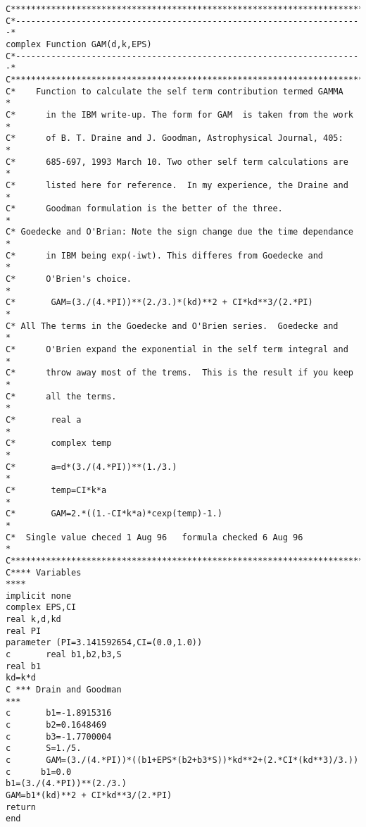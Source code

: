 \documentclass{article}
\begin{document}
\begin{verbatim}
C***********************************************************************       
C*---------------------------------------------------------------------*
complex Function GAM(d,k,EPS)                                     
C*---------------------------------------------------------------------*      
C***********************************************************************
C*    Function to calculate the self term contribution termed GAMMA    *
C*      in the IBM write-up. The form for GAM  is taken from the work  *
C*      of B. T. Draine and J. Goodman, Astrophysical Journal, 405:    *
C*      685-697, 1993 March 10. Two other self term calculations are   *
C*      listed here for reference.  In my experience, the Draine and   *
C*      Goodman formulation is the better of the three.                *
C* Goedecke and O'Brian: Note the sign change due the time dependance  *
C*      in IBM being exp(-iwt). This differes from Goedecke and        *
C*      O'Brien's choice.                                              *
C*       GAM=(3./(4.*PI))**(2./3.)*(kd)**2 + CI*kd**3/(2.*PI)          *
C* All The terms in the Goedecke and O'Brien series.  Goedecke and     *
C*      O'Brien expand the exponential in the self term integral and   *
C*      throw away most of the trems.  This is the result if you keep  *
C*      all the terms.                                                 *
C*       real a                                                        *
C*       complex temp                                                  *
C*       a=d*(3./(4.*PI))**(1./3.)                                     *
C*       temp=CI*k*a                                                   *
C*       GAM=2.*((1.-CI*k*a)*cexp(temp)-1.)                            * 
C*  Single value checed 1 Aug 96   formula checked 6 Aug 96            *
C***********************************************************************
C**** Variables                                                     ****  
implicit none
complex EPS,CI      
real k,d,kd
real PI
parameter (PI=3.141592654,CI=(0.0,1.0)) 
c       real b1,b2,b3,S
real b1
kd=k*d
C *** Drain and Goodman                                              ***
c       b1=-1.8915316
c       b2=0.1648469
c       b3=-1.7700004
c       S=1./5.
c       GAM=(3./(4.*PI))*((b1+EPS*(b2+b3*S))*kd**2+(2.*CI*(kd**3)/3.))
c      b1=0.0
b1=(3./(4.*PI))**(2./3.)
GAM=b1*(kd)**2 + CI*kd**3/(2.*PI)          
return
end
\end{verbatim}%
\end{document}
